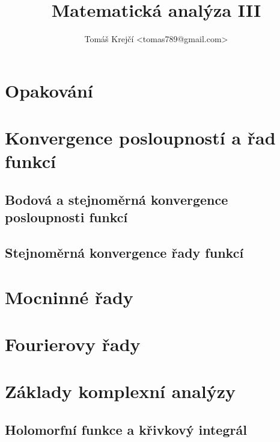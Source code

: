 \documentclass[12pt,a4paper]{article}
\title{Matematická analýza III}
\author{Tomáš Krejčí <tomas789@gmail.com>}
\newcounter{vety}
\begin{document}
\maketitle

\section*{Opakování}



\pagebreak
\setcounter{section}{9}
\section{Konvergence posloupností a řad funkcí}

\subsection{Bodová a stejnoměrná konvergence posloupnosti funkcí}



\subsection{Stejnoměrná konvergence řady funkcí}



\pagebreak
\setcounter{vety}{0}
\section{Mocninné řady}



\pagebreak
\setcounter{vety}{0}
\section{Fourierovy řady}



\pagebreak
\setcounter{vety}{0}
\section{Základy komplexní analýzy}



\subsection{Holomorfní funkce a křivkový integrál}
\end{document}
